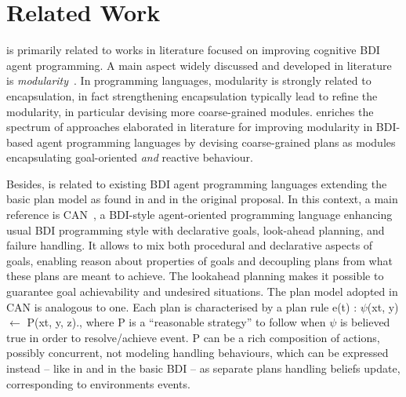 \section{Related Work}
\label{sec:related}

{\aser} is primarily related to works in literature focused on improving cognitive BDI agent programming.
%
%
A main aspect widely discussed and developed in literature is  \emph{modularity}~\cite{Madden2010, Busetta2000,5285116,Novak:2006:MBA:1160633.1160814,Ortiz-Hernandez2016,vanRiemsdijk:2006:GMA:1160633.1160864,Hindriks2008,Nunes2014}.
%
In programming languages, modularity is strongly related to encapsulation, in fact  strengthening encapsulation typically lead to refine the modularity, in particular devising more coarse-grained modules.
%
{\aser} enriches the spectrum of approaches elaborated in literature for improving modularity in BDI-based agent programming languages by devising coarse-grained plans as modules encapsulating goal-oriented \emph{and} reactive behaviour. 

Besides, {\aser} is related to existing BDI agent programming languages extending the basic plan model as found in {\asl} and in the original proposal.
%
In this context, a main reference is \textsf{CAN}~\cite{Sardina2011}, a  BDI-style agent-oriented programming language enhancing  usual BDI programming style with declarative goals, look-ahead planning, and failure handling. 
%
It allows to mix both procedural and declarative aspects of goals, enabling reason about  properties of goals and decoupling plans from what these plans are meant to achieve. 
%
The lookahead planning makes it possible to guarantee goal achievability and undesired situations. 
%
The plan model adopted in {\textsf{CAN}} is analogous to {\asl} one. Each plan is characterised by a plan rule \textsf{e(t) : $\psi$(xt, y) $\leftarrow$ P(xt, y, z).}, where \textsf{P} is a ``reasonable strategy'' to follow when \textsf{$\psi$} is believed true in order to resolve/achieve event.
%
\textsf{P} can be a rich composition of actions, possibly concurrent, not modeling handling behaviours, which can be expressed instead -- like in {\asl} and in the basic BDI -- as separate plans handling beliefs update, corresponding  to environments events. 